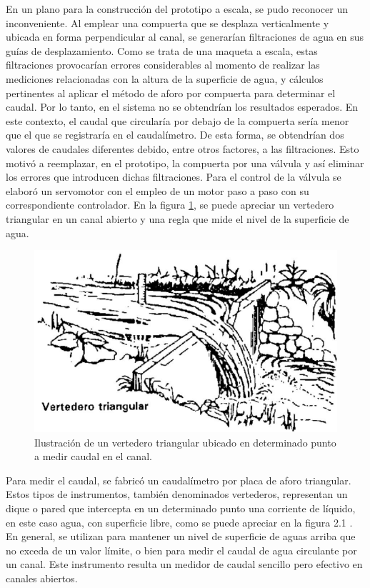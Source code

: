 En un plano para la construcción del prototipo a escala, se pudo reconocer un inconveniente. Al emplear una compuerta que se desplaza verticalmente y ubicada en forma perpendicular al canal, se generarían filtraciones de agua en sus guías de desplazamiento. Como se trata de una maqueta a escala, estas filtraciones provocarían errores considerables al momento de realizar las mediciones relacionadas con la altura de la superficie de agua, y cálculos pertinentes al aplicar el método de aforo por compuerta para determinar el caudal. Por lo tanto, en el sistema no se obtendrían los resultados esperados. En este contexto, el caudal que circularía por debajo de la compuerta sería menor que el que se registraría en el caudalímetro. De esta forma, se obtendrían dos valores de caudales diferentes debido, entre otros factores, a las filtraciones.     
Esto motivó a reemplazar, en el prototipo, la compuerta por una válvula y así eliminar los errores que introducen dichas filtraciones. 
Para el control de la válvula se elaboró un servomotor con el empleo de un motor paso a paso con su correspondiente controlador.
En la figura \ref{fig:Vertedero triangular}, se puede apreciar un vertedero triangular en un canal abierto y una regla que mide el nivel de la superficie de agua.
\begin{figure}[h]
\centering
\includegraphics[scale=.60]{./Figures/VertederoTriangular.png}
\caption{Ilustración de un vertedero triangular ubicado en determinado punto a medir caudal en el canal.}
\label{fig:Vertedero triangular}
\end{figure}

Para medir el caudal, se fabricó un caudalímetro por placa de aforo triangular. Estos tipos de instrumentos, también denominados vertederos, representan un dique o pared que intercepta en un determinado punto una corriente de líquido, en este caso agua, con superficie libre, como se puede apreciar en la figura 2.1 . En general, se utilizan para mantener un nivel de superficie de aguas arriba que no exceda de un valor límite, o bien para medir el caudal de agua circulante por un canal. Este instrumento resulta un medidor de caudal sencillo pero efectivo en canales abiertos. 

